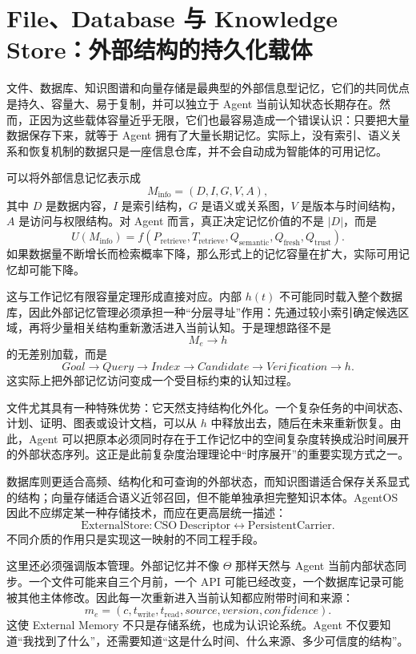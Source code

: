 \section{File、Database 与 Knowledge Store：外部结构的持久化载体}

文件、数据库、知识图谱和向量存储是最典型的外部信息型记忆，它们的共同优点是持久、容量大、易于复制，并可以独立于 Agent 当前认知状态长期存在。然而，正因为这些载体容量近乎无限，它们也最容易造成一个错误认识：只要把大量数据保存下来，就等于 Agent 拥有了大量长期记忆。实际上，没有索引、语义关系和恢复机制的数据只是一座信息仓库，并不会自动成为智能体的可用记忆。

可以将外部信息记忆表示成
\[
M_{\mathrm{info}}
=
(D,I,G,V,A),
\]
其中 \(D\) 是数据内容，\(I\) 是索引结构，\(G\) 是语义或关系图，\(V\) 是版本与时间结构，\(A\) 是访问与权限结构。对 Agent 而言，真正决定记忆价值的不是 \(|D|\)，而是
\[
U(M_{\mathrm{info}})
=
f(
P_{\mathrm{retrieve}},
T_{\mathrm{retrieve}},
Q_{\mathrm{semantic}},
Q_{\mathrm{fresh}},
Q_{\mathrm{trust}}
).
\]
如果数据量不断增长而检索概率下降，那么形式上的记忆容量在扩大，实际可用记忆却可能下降。

这与工作记忆有限容量定理形成直接对应。内部 \(h(t)\) 不可能同时载入整个数据库，因此外部记忆管理必须承担一种``分层寻址''作用：先通过较小索引确定候选区域，再将少量相关结构重新激活进入当前认知。于是理想路径不是
\[
M_e\rightarrow h
\]
的无差别加载，而是
\[
Goal
\rightarrow
Query
\rightarrow
Index
\rightarrow
Candidate
\rightarrow
Verification
\rightarrow
h.
\]
这实际上把外部记忆访问变成一个受目标约束的认知过程。

文件尤其具有一种特殊优势：它天然支持结构化外化。一个复杂任务的中间状态、计划、证明、图表或设计文档，可以从 \(h\) 中释放出去，随后在未来重新恢复。由此，Agent 可以把原本必须同时存在于工作记忆中的空间复杂度转换成沿时间展开的外部状态序列。这正是此前复杂度治理理论中``时序展开''的重要实现方式之一。

数据库则更适合高频、结构化和可查询的外部状态，而知识图谱适合保存关系显式的结构；向量存储适合语义近邻召回，但不能单独承担完整知识本体。AgentOS 因此不应绑定某一种存储技术，而应在更高层统一描述：
\[
\mathrm{ExternalStore}
:
\mathrm{CSO\ Descriptor}
\leftrightarrow
\mathrm{PersistentCarrier}.
\]
不同介质的作用只是实现这一映射的不同工程手段。

这里还必须强调版本管理。外部记忆并不像 \(\Theta\) 那样天然与 Agent 当前内部状态同步。一个文件可能来自三个月前，一个 API 可能已经改变，一个数据库记录可能被其他主体修改。因此每一次重新进入当前认知都应附带时间和来源：
\[
m_e
=
(c,t_{\mathrm{write}},t_{\mathrm{read}},source,version,confidence).
\]
这使 External Memory 不只是存储系统，也成为认识论系统。Agent 不仅要知道``我找到了什么''，还需要知道``这是什么时间、什么来源、多少可信度的结构''。

